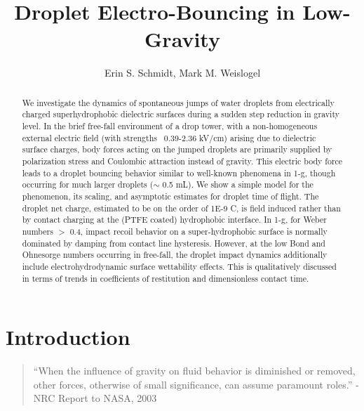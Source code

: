 \documentclass[10pt,a4paper]{article}
\title{\textsf{\textbf{Droplet Electro-Bouncing in Low-Gravity}}}
\author{Erin S. Schmidt, Mark M. Weislogel}
\date{}
\begin{document}
\maketitle
\doublespacing

\begin{abstract}
\noindent
We investigate the dynamics of spontaneous jumps of water droplets from electrically charged superhydrophobic dielectric surfaces during a sudden step reduction in gravity level. In the brief free-fall environment of a drop tower, with a non-homogeneous external electric field (with strengths ~0.39-2.36 kV/cm) arising due to dielectric surface charges, body forces acting on the jumped droplets are primarily supplied by polarization stress and Coulombic attraction instead of gravity. This electric body force leads to a droplet bouncing behavior similar to well-known phenomena in 1-g, though occurring for much larger droplets ($\sim$ 0.5 mL). We show a simple model for the phenomenon, its scaling, and asymptotic estimates for droplet time of flight. The droplet net charge, estimated to be on the order of 1E-9 C, is field induced rather than by contact charging at the (PTFE coated) hydrophobic interface. In 1-g, for Weber numbers $>$ 0.4, impact recoil behavior on a super-hydrophobic surface is normally dominated by damping from contact line hysteresis. However, at the low Bond and Ohnesorge numbers occurring in free-fall, the droplet impact dynamics additionally include electrohydrodynamic surface wettability effects. This is qualitatively discussed in terms of trends in coefficients of restitution and dimensionless contact time.
\end{abstract}

\section{Introduction}
\begin{quote}
``When the influence of gravity on fluid behavior is diminished or removed, other forces, otherwise of small significance, can assume paramount roles.''
- NRC Report to NASA, 2003  \cite{motil_priorities_2012}
\end{quote}
\end{document}
